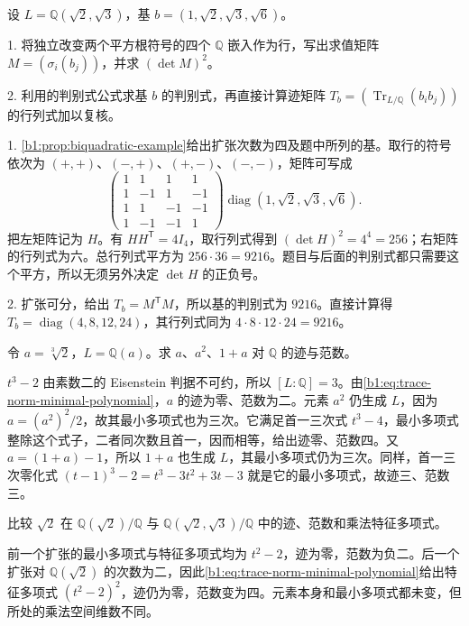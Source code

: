 \begin{exercise}\label{b1:ex:18-evaluation-matrix}
	设 \(L=\mathbb Q(\sqrt2,\sqrt3)\)，基 \(b=(1,\sqrt2,\sqrt3,\sqrt6)\)。

	1. 将独立改变两个平方根符号的四个 \(\mathbb Q\) 嵌入作为行，写出求值矩阵 \(M=(\sigma_i(b_j))\)，并求 \((\det M)^2\)。

	2. 利用的判别式公式求基 \(b\) 的判别式，再直接计算迹矩阵 \(T_b=(\operatorname{Tr}_{L/\mathbb Q}(b_i b_j))\) 的行列式加以复核。
\end{exercise}
\begin{solution}
	1. \cref{b1:prop:biquadratic-example}给出扩张次数为四及题中所列的基。取行的符号依次为 \((+,+)\)、\((-,+)\)、\((+,-)\)、\((-,-)\)，矩阵可写成
	\[
		\begin{pmatrix}1&1&1&1\\1&-1&1&-1\\1&1&-1&-1\\1&-1&-1&1\end{pmatrix}
		\operatorname{diag}(1,\sqrt2,\sqrt3,\sqrt6).
	\]
	把左矩阵记为 \(H\)。有 \(HH^{\mathsf T}=4I_4\)，取行列式得到 \((\det H)^2=4^4=256\)；右矩阵的行列式为六。总行列式平方为 \(256\cdot36=9216\)。题目与后面的判别式都只需要这个平方，所以无须另外决定 \(\det H\) 的正负号。

	2. 扩张可分，给出 \(T_b=M^{\mathsf T}M\)，所以基的判别式为 \(9216\)。直接计算得 \(T_b=\operatorname{diag}(4,8,12,24)\)，其行列式同为 \(4\cdot8\cdot12\cdot24=9216\)。
\end{solution}

\begin{exercise}\label{b1:ex:18-cubic-trace-norm}
	令 \(a=\sqrt[3]2\)，\(L=\mathbb Q(a)\)。求 \(a\)、\(a^2\)、\(1+a\) 对 \(\mathbb Q\) 的迹与范数。
\end{exercise}
\begin{solution}
	\(t^3-2\) 由素数二的 Eisenstein 判据不可约，所以 \([L:\mathbb Q]=3\)。由\eqref{b1:eq:trace-norm-minimal-polynomial}，\(a\) 的迹为零、范数为二。元素 \(a^2\) 仍生成 \(L\)，因为 \(a=(a^2)^2/2\)，故其最小多项式也为三次。它满足首一三次式 \(t^3-4\)，最小多项式整除这个式子，二者同次数且首一，因而相等，给出迹零、范数四。又 \(a=(1+a)-1\)，所以 \(1+a\) 也生成 \(L\)，其最小多项式仍为三次。同样，首一三次零化式 \((t-1)^3-2=t^3-3t^2+3t-3\) 就是它的最小多项式，故迹三、范数三。
\end{solution}

\begin{exercise}\label{b1:ex:18-ambient-extension}
	比较 \(\sqrt2\) 在 \(\mathbb Q(\sqrt2)/\mathbb Q\) 与 \(\mathbb Q(\sqrt2,\sqrt3)/\mathbb Q\) 中的迹、范数和乘法特征多项式。
\end{exercise}
\begin{solution}
	前一个扩张的最小多项式与特征多项式均为 \(t^2-2\)，迹为零，范数为负二。后一个扩张对 \(\mathbb Q(\sqrt2)\) 的次数为二，因此\eqref{b1:eq:trace-norm-minimal-polynomial}给出特征多项式 \((t^2-2)^2\)，迹仍为零，范数变为四。元素本身和最小多项式都未变，但所处的乘法空间维数不同。
\end{solution}

